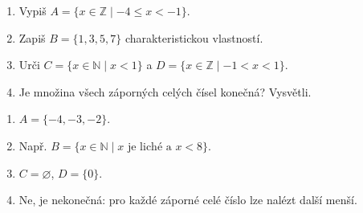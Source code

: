 \documentclass[11pt,a4paper]{article}
\begin{document}
\begin{zadaniReseniBox}[title={Domácí úkol}]
\begin{enumerate}[label=\alph*)]
\item Vypiš $A=\{x\in\mathbb Z\mid -4\le x<-1\}$.
\item Zapiš $B=\{1,3,5,7\}$ charakteristickou vlastností.
\item Urči $C=\{x\in\mathbb N\mid x<1\}$ a $D=\{x\in\mathbb Z\mid -1<x<1\}$.
\item Je množina všech záporných celých čísel konečná? Vysvětli.
\end{enumerate}
\tcblower
\begin{enumerate}[label=\alph*)]
\item $A=\{-4,-3,-2\}$.
\item Např. $B=\{x\in\mathbb N\mid x\text{ je liché a }x<8\}$.
\item $C=\varnothing$, $D=\{0\}$.
\item Ne, je nekonečná: pro každé záporné celé číslo lze nalézt další menší.
\end{enumerate}
\end{zadaniReseniBox}
\end{document}

